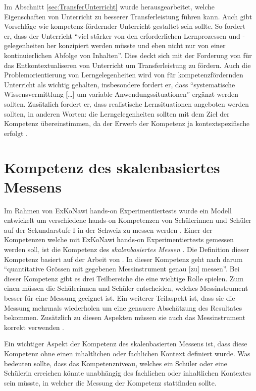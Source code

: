 Im Abschnitt \ref{sec:TransferUnterricht} wurde herausgearbeitet, welche Eigenschaften von Unterricht zu besserer Transferleistung führen kann. Auch \citet{Lersch2007} gibt Vorschläge wie kompetenz-fördernder Unterricht gestaltet sein sollte. So fordert er, dass der Unterricht "`viel stärker von den erforderlichen Lernprozessen und -gelegenheiten her konzipiert werden müsste und eben nicht nur von einer kontinuierlichen Abfolge von Inhalten"'. Dies deckt sich mit der Forderung von \citet{Mietzel2007} für das Entkontextualiseren von Unterricht um Transferleistung zu fördern. Auch die Problemorientierung von Lerngelegenheiten wird von \citet{Lersch2007} für kompetenzfördernden Unterricht als wichtig gehalten, insbesondere fordert er, dass "`systematische Wissensvermittlung […] um variable Anwendungssituationen"' ergänzt werden sollten. Zusätzlich fordert er, dass realistische Lernsituationen angeboten werden sollten, in anderen Worten: die Lerngelegenheiten sollten mit dem Ziel der Kompetenz übereinstimmen, da der Erwerb der Kompetenz ja kontextspezifische erfolgt \citep{Klieme2004}.



\section{Kompetenz des skalenbasiertes Messens}

Im Rahmen von ExKoNawi hands-on Experimentiertests wurde ein Modell entwickelt um verschiedene hands-on Kompetenzen von Schülerinnen und Schüler auf der Sekundarstufe I in der Schweiz zu messen werden \citep{Metzger2013}. Einer der Kompetenzen welche mit ExKoNawi hands-on Experimentiertests gemessen werden soll, ist die Kompetenz des \textit{skalenbasiertes Messen} \citep{Gut2013a}. Die Definition dieser Kompetenz basiert auf der Arbeit von \citet{Munier2013}. In dieser Kompetenz geht nach \citep{Gut2013a} darum "`quantitative Grössen mit gegebenen Messinstrument genau [zu] messen"'. Bei dieser Kompetenz gibt es drei Teilbereiche die eine wichtige Rolle spielen. Zum einen müssen die Schülerinnen und Schüler entscheiden, welches Messinstrument besser für eine Messung geeignet ist. Ein weiterer Teilaspekt ist, dass sie die Messung mehrmals wiederholen um eine genauere Abschätzung des Resultates bekommen. Zusätzlich zu diesen Aspekten müssen sie auch das Messinstrument korrekt verwenden \citep{Munier2013,Gut2013a}.

Ein wichtiger Aspekt der Kompetenz des skalenbasierten Messens ist, dass diese Kompetenz ohne einen inhaltlichen oder fachlichen Kontext definiert wurde. Was bedeuten sollte, dass das Kompetenzniveau, welches ein Schüler oder eine Schülerin erreichen könnte unabhängig des fachlichen oder inhaltlichen Kontextes sein müsste, in welcher die Messung der Kompetenz stattfinden sollte.

